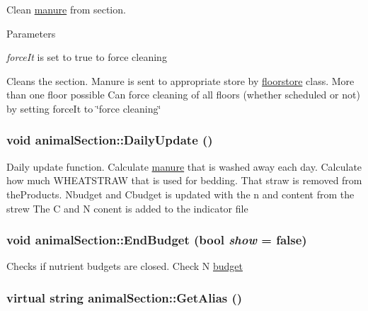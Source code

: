 Clean \hyperlink{classmanure}{manure} from section. 
\begin{DoxyParams}{Parameters}
\item[{\em forceIt}]is set to true to force cleaning\end{DoxyParams}
Cleans the section. Manure is sent to appropriate store by \hyperlink{classfloorstore}{floorstore} class. More than one floor possible Can force cleaning of all floors (whether scheduled or not) by setting forceIt to \char`\"{}force cleaning\char`\"{} \hypertarget{classanimal_section_aadfcafebdfc59ced126788f1425e3780}{
\subsubsection[{DailyUpdate}]{\setlength{\rightskip}{0pt plus 5cm}void animalSection::DailyUpdate ()}}
\label{classanimal_section_aadfcafebdfc59ced126788f1425e3780}


Daily update function. Calculate \hyperlink{classmanure}{manure} that is washed away each day. Calculate how much WHEATSTRAW that is used for bedding. That straw is removed from theProducts. Nbudget and Cbudget is updated with the n and content from the strew The C and N conent is added to the indicator file \hypertarget{classanimal_section_afeb7aebaaa99c762e3d1fc61bb47f03b}{
\subsubsection[{EndBudget}]{\setlength{\rightskip}{0pt plus 5cm}void animalSection::EndBudget (bool {\em show} = {\ttfamily false})}}
\label{classanimal_section_afeb7aebaaa99c762e3d1fc61bb47f03b}


Checks if nutrient budgets are closed. Check N \hyperlink{classbudget}{budget} \hypertarget{classanimal_section_a8273d771612eb157505ecacc6677c29f}{
\subsubsection[{GetAlias}]{\setlength{\rightskip}{0pt plus 5cm}virtual string animalSection::GetAlias ()}}
\label{classanimal_section_a8273d771612eb157505ecacc6677c29f}


